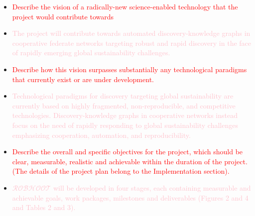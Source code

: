 \documentclass[11pt, a4paper]{article} %
\begin{document}
\begin{itemize}
\item \textcolor{red}{Describe the vision of a radically-new
    science-enabled technology that the project would contribute
    towards}
\item \textcolor{pink}{The project will contribute towards automated
    discovery-knowledge graphs in cooperative federate networks
    targeting robust and rapid discovery in the face of rapidly
    emerging global sustainability challenges.}
\item \textcolor{red}{Describe how this vision surpasses substantially
    any technological paradigms that currently exist or are under
    development.}
\item \textcolor{pink}{Technological paradigms for discovery targeting
    global sustainability are currently based on highly fragmented,
    non-reproducible, and competitive
    technologies. Discovery-knowledge graphs in cooperative networks
    instead focus on the need of rapidly responding to global
    sustainability challenges emphasizing cooperation, automation, and
    reproducibility.}
\item \textcolor{red}{Describe the overall and specific objectives for
    the project, which should be clear, measurable, realistic and
    achievable within the duration of the project. (The details of the
    project plan belong to the Implementation section).}
\item \textcolor{pink}{$\mathcal{ROBHOOT}$ will be developed in four
    stages, each containing measurable and achievable goals, work
    packages, milestones and deliverables (Figures 2 and 4 and Tables
    2 and 3).}
\end{itemize}
\end{document}
